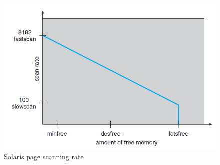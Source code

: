 \documentclass{article}
\theoremstyle{plain}
\theoremstyle{definition}
\begin{document}
\begin{figure}[!h]
    \centering
    \includegraphics[scale=0.8]{os17.png}
    \caption{Solaris page scanning rate}
    \label{fig:my_label_17s}
\end{figure}
\end{document}
